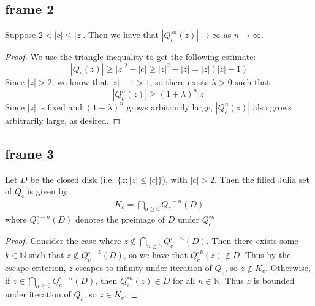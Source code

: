 \documentclass[xcolor=x11names,compress]{beamer}
\renewcommand{\(}{\begin{columns}}
\renewcommand{\)}{\end{columns}}
\newcommand{\<}[1]{\begin{column}{#1}}
\renewcommand{\>}{\end{column}}
\begin{document}
\subsection{frame 2}
\begin{frame}
\begin{theorem} 
Suppose $2 < |c| \le |z|$. Then we have that $|Q_c^{\circ n}(z)| \rightarrow \infty$ as $n \rightarrow \infty$.
\end{theorem}
\pause
\begin{proof}
We use the triangle inequality to get the following estimate:
\begin{equation}
|Q_c(z)| \geq |z|^2 - |c| \geq |z|^2 - |z| = |z|(|z|-1)
\end{equation}
Since $|z| > 2$, we know that $|z|-1>1$, so there exists $\lambda > 0$ such that
\begin{equation}
|Q_c^n(z)| \geq (1+\lambda)^n|z|
\end{equation}
Since $|z|$ is fixed and $(1+\lambda)^n$ grows arbitrarily large, $|Q_c^n(z)|$ also grows arbitrarily large, as desired.
\end{proof}
\end{frame}
\subsection{frame 3}
\begin{frame}
\begin{theorem}
Let $D$ be the closed disk (i.e. $\{z : |z| \le |c|\}$), with $|c|>2$. Then the filled Julia set of $Q_c$ is given by
\begin{align*}
K_c = \bigcap\limits_{n\ge 0} Q_c^{\circ -n} (D)
\end{align*}
where $Q_c^{\circ -n} (D)$ denotes the preimage of $D$ under $Q_c^{\circ n}$
\end{theorem}
\pause
\begin{proof}
Consider the case where
$z\notin \bigcap_{n\ge 0} Q_c^{\circ -n} (D)$.
Then there exists some $k\in \mathbb{N}$ such that $z\notin Q_c^{\circ -k} (D)$,
so we have that $Q_c^{\circ k}(z) \notin D$.
Thus by the escape criterion, $z$ escapes to infinity under iteration
of $Q_c$, so $z\notin K_c$.
Otherwise, if $z\in \bigcap_{n\ge 0} Q_c^{\circ -n} (D)$, then
$Q_c^{\circ n}(z) \in D$ for all $n\in \mathbb{N}$. Thus $z$ is bounded under
iteration of $Q_c$, so $z\in K_c$.
\end{proof}
\end{frame}
\end{document}
